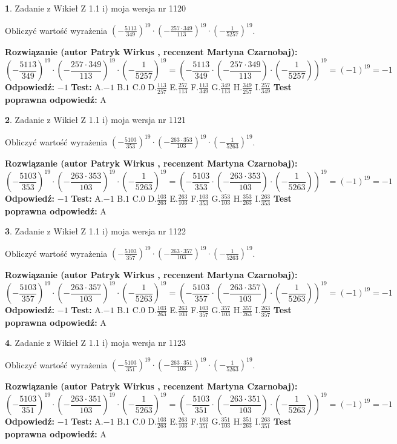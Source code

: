 \documentclass[12pt, a4paper]{article}
\theoremstyle{definition} %
\newtheorem{zad}{}
\newcommand{\zadStart}[1]{\begin{zad}#1\newline}
\newcommand{\zadStop}{\end{zad}}
\newcommand{\rozwStart}[2]{\noindent \textbf{Rozwiązanie (autor #1 , recenzent #2): }\newline}
\newcommand{\rozwStop}{\newline}
\newcommand{\odpStart}{\noindent \textbf{Odpowiedź:}\newline}
\newcommand{\odpStop}{\newline}
\newcommand{\testStart}{\noindent \textbf{Test:}\newline}
\newcommand{\testStop}{\newline}
\newcommand{\kluczStart}{\noindent \textbf{Test poprawna odpowiedź:}\newline}
\newcommand{\kluczStop}{\newline}
\begin{document}
\zadStart{Zadanie z Wikieł Z 1.1 i) moja wersja nr 1120}

Obliczyć wartość wyrażenia $(-\frac{5113}{349})^{19} \cdot (-\frac{257 \cdot 349}{113})^{19} \cdot (-\frac{1}{5257})^{19}$.
\zadStop
\rozwStart{Patryk Wirkus}{Martyna Czarnobaj}
$$(-\frac{5113}{349})^{19} \cdot (-\frac{257 \cdot 349}{113})^{19} \cdot (-\frac{1}{5257})^{19} = (-\frac{5113}{349} \cdot (-\frac{257 \cdot 349}{113}) \cdot (-\frac{1}{5257}))^{19} = (-1)^{19} = -1$$
\rozwStop
\odpStart
$-1$
\odpStop
\testStart
A.$-1$ B.$1$ C.$0$ D.$\frac{113}{257}$ E.$\frac{257}{113}$
F.$\frac{113}{349}$ G.$\frac{349}{113}$
H.$\frac{349}{257}$
I.$\frac{257}{349}$
\testStop
\kluczStart
A
\kluczStop



\zadStart{Zadanie z Wikieł Z 1.1 i) moja wersja nr 1121}

Obliczyć wartość wyrażenia $(-\frac{5103}{353})^{19} \cdot (-\frac{263 \cdot 353}{103})^{19} \cdot (-\frac{1}{5263})^{19}$.
\zadStop
\rozwStart{Patryk Wirkus}{Martyna Czarnobaj}
$$(-\frac{5103}{353})^{19} \cdot (-\frac{263 \cdot 353}{103})^{19} \cdot (-\frac{1}{5263})^{19} = (-\frac{5103}{353} \cdot (-\frac{263 \cdot 353}{103}) \cdot (-\frac{1}{5263}))^{19} = (-1)^{19} = -1$$
\rozwStop
\odpStart
$-1$
\odpStop
\testStart
A.$-1$ B.$1$ C.$0$ D.$\frac{103}{263}$ E.$\frac{263}{103}$
F.$\frac{103}{353}$ G.$\frac{353}{103}$
H.$\frac{353}{263}$
I.$\frac{263}{353}$
\testStop
\kluczStart
A
\kluczStop



\zadStart{Zadanie z Wikieł Z 1.1 i) moja wersja nr 1122}

Obliczyć wartość wyrażenia $(-\frac{5103}{357})^{19} \cdot (-\frac{263 \cdot 357}{103})^{19} \cdot (-\frac{1}{5263})^{19}$.
\zadStop
\rozwStart{Patryk Wirkus}{Martyna Czarnobaj}
$$(-\frac{5103}{357})^{19} \cdot (-\frac{263 \cdot 357}{103})^{19} \cdot (-\frac{1}{5263})^{19} = (-\frac{5103}{357} \cdot (-\frac{263 \cdot 357}{103}) \cdot (-\frac{1}{5263}))^{19} = (-1)^{19} = -1$$
\rozwStop
\odpStart
$-1$
\odpStop
\testStart
A.$-1$ B.$1$ C.$0$ D.$\frac{103}{263}$ E.$\frac{263}{103}$
F.$\frac{103}{357}$ G.$\frac{357}{103}$
H.$\frac{357}{263}$
I.$\frac{263}{357}$
\testStop
\kluczStart
A
\kluczStop



\zadStart{Zadanie z Wikieł Z 1.1 i) moja wersja nr 1123}

Obliczyć wartość wyrażenia $(-\frac{5103}{351})^{19} \cdot (-\frac{263 \cdot 351}{103})^{19} \cdot (-\frac{1}{5263})^{19}$.
\zadStop
\rozwStart{Patryk Wirkus}{Martyna Czarnobaj}
$$(-\frac{5103}{351})^{19} \cdot (-\frac{263 \cdot 351}{103})^{19} \cdot (-\frac{1}{5263})^{19} = (-\frac{5103}{351} \cdot (-\frac{263 \cdot 351}{103}) \cdot (-\frac{1}{5263}))^{19} = (-1)^{19} = -1$$
\rozwStop
\odpStart
$-1$
\odpStop
\testStart
A.$-1$ B.$1$ C.$0$ D.$\frac{103}{263}$ E.$\frac{263}{103}$
F.$\frac{103}{351}$ G.$\frac{351}{103}$
H.$\frac{351}{263}$
I.$\frac{263}{351}$
\testStop
\kluczStart
A
\kluczStop
\end{document}
